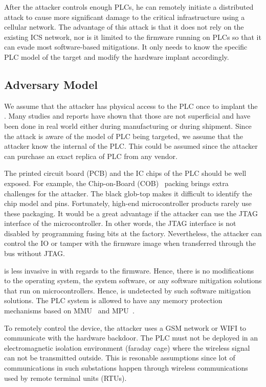After the attacker controls enough PLCs, he can remotely initiate a distributed attack to cause more significant damage to the critical infrastructure using a cellular network. The advantage of this attack is that it does not rely on the existing ICS network, nor is it limited to the firmware running on PLCs so that it can evade most software-based mitigations. It only needs to know the specific PLC model of the target and modify the hardware implant accordingly.


\subsection{Adversary Model}

We assume that the attacker has physical access to the PLC once to implant the \name. Many studies and reports have shown that those are not superficial and have been done in real world \cite{harrison2021malicious, o2015special, robertson2018big} either during manufacturing or during shipment. Since the attack is aware of the model of PLC being targeted, we assume that the attacker know the internal of the PLC. This could be assumed since the attacker can purchase an exact replica of PLC from any vendor. 


The printed circuit board (PCB) and the IC chips of the PLC should be well exposed. For example, the Chip-on-Board (COB)~\cite{lau1994chip} packing brings extra challenges for the attacker. The black glob-top makes it difficult to identify the chip model and pins. Fortunately, high-end microcontroller products rarely use these packaging. It would be a great advantage if the attacker can use the JTAG interface of the microcontroller. In other words, the JTAG interface is not disabled by programming fusing bits at the factory. Nevertheless, the attacker can control the IO or tamper with the firmware image when transferred through the bus without JTAG.

\name is less invasive in with regards to the firmware. Hence, there is no modifications to the operating system, the system software, or any software mitigation solutions that run on microcontrollers. Hence, \name is undetected by such software mitigation solutions. The PLC system is allowed to have any memory protection mechanisms based on MMU~\cite{shalan2000dynamic} and MPU~\cite{kim2018securing}.

To remotely control the device, the attacker uses a GSM network or WIFI to communicate with the hardware backdoor. The PLC must not be deployed in an electromagnetic isolation environment (faraday cage) where the wireless signal can not be transmitted outside. This is resonable assumptions since lot of communications in such substations happen through wireless communications used by remote terminal units (RTUs).



